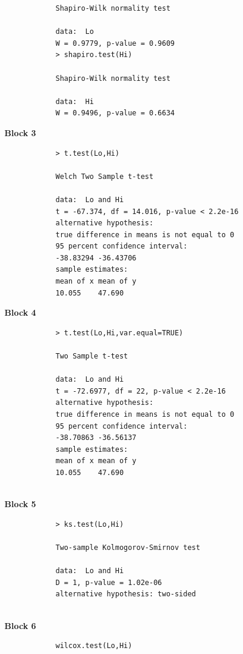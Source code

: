 \documentclass[a4paper,12pt]{article}
\begin{document}
\begin{itemize}
\begin{itemize}
\begin{framed}
\begin{verbatim}
			Shapiro-Wilk normality test
			
			data:  Lo
			W = 0.9779, p-value = 0.9609
			> shapiro.test(Hi)
			
			Shapiro-Wilk normality test
			
			data:  Hi
			W = 0.9496, p-value = 0.6634
			\end{verbatim}
		\end{framed}
		\bigskip
		\item[\textbf{Block 3}]
		\begin{framed}
			\begin{verbatim}
			> t.test(Lo,Hi)
			
			Welch Two Sample t-test
			
			data:  Lo and Hi
			t = -67.374, df = 14.016, p-value < 2.2e-16
			alternative hypothesis: 
			true difference in means is not equal to 0
			95 percent confidence interval:
			-38.83294 -36.43706
			sample estimates:
			mean of x mean of y 
			10.055    47.690 
			\end{verbatim}
		\end{framed}
		
		\item[\textbf{Block 4}]
		\begin{framed}
			\begin{verbatim}
			> t.test(Lo,Hi,var.equal=TRUE)
			
			Two Sample t-test
			
			data:  Lo and Hi
			t = -72.6977, df = 22, p-value < 2.2e-16
			alternative hypothesis: 
			true difference in means is not equal to 0
			95 percent confidence interval:
			-38.70863 -36.56137
			sample estimates:
			mean of x mean of y 
			10.055    47.690 
			
			\end{verbatim}
		\end{framed}
		
		
		
		\item[\textbf{Block 5}]
		\begin{framed}
			\begin{verbatim}
			> ks.test(Lo,Hi)
			
			Two-sample Kolmogorov-Smirnov test
			
			data:  Lo and Hi
			D = 1, p-value = 1.02e-06
			alternative hypothesis: two-sided
			
			\end{verbatim}
		\end{framed}
		\item[\textbf{Block 6}]
		\begin{framed}
			\begin{verbatim}
			wilcox.test(Lo,Hi)
			

\end{verbatim}
\end{framed}
\end{itemize}
\end{itemize}
\end{document}
